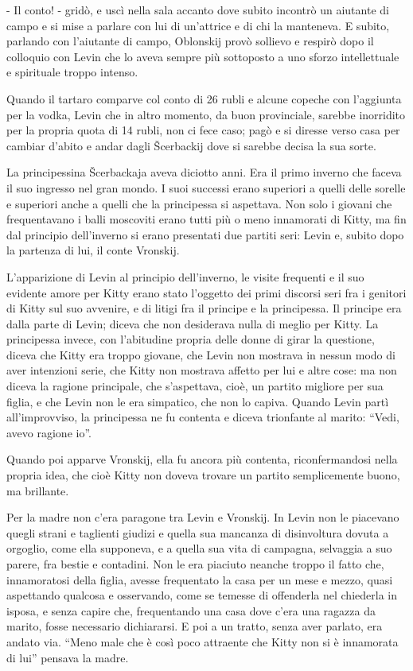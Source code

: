 - Il conto! - gridò, e uscì nella sala accanto dove subito incontrò un aiutante di campo e si mise a parlare con lui di un'attrice e di chi la manteneva. E subito, parlando con l'aiutante di campo, Oblonskij provò sollievo e respirò dopo il colloquio con Levin che lo aveva sempre più sottoposto a uno sforzo intellettuale e spirituale troppo intenso. 

Quando il tartaro comparve col conto di 26 rubli e alcune copeche con l'aggiunta per la vodka, Levin che in altro momento, da buon provinciale, sarebbe inorridito per la propria quota di 14 rubli, non ci fece caso; pagò e si diresse verso casa per cambiar d'abito e andar dagli Šcerbackij dove si sarebbe decisa la sua sorte. 

La principessina Šcerbackaja aveva diciotto anni. Era il primo inverno che faceva il suo ingresso nel gran mondo. I suoi successi erano superiori a quelli delle sorelle e superiori anche a quelli che la principessa si aspettava. Non solo i giovani che frequentavano i balli moscoviti erano tutti più o meno innamorati di Kitty, ma fin dal principio dell'inverno si erano presentati due partiti seri: Levin e, subito dopo la partenza di lui, il conte Vronskij. 

L'apparizione di Levin al principio dell'inverno, le visite frequenti e il suo evidente amore per Kitty erano stato l'oggetto dei primi discorsi seri fra i genitori di Kitty sul suo avvenire, e di litigi fra il principe e la principessa. Il principe era dalla parte di Levin; diceva che non desiderava nulla di meglio per Kitty. La principessa invece, con l'abitudine propria delle donne di girar la questione, diceva che Kitty era troppo giovane, che Levin non mostrava in nessun modo di aver intenzioni serie, che Kitty non mostrava affetto per lui e altre cose: ma non diceva la ragione principale, che s'aspettava, cioè, un partito migliore per sua figlia, e che Levin non le era simpatico, che non lo capiva. Quando Levin partì all'improvviso, la principessa ne fu contenta e diceva trionfante al marito: ``Vedi, avevo ragione io''. 

Quando poi apparve Vronskij, ella fu ancora più contenta, riconfermandosi nella propria idea, che cioè Kitty non doveva trovare un partito semplicemente buono, ma brillante. 

Per la madre non c'era paragone tra Levin e Vronskij. In Levin non le piacevano quegli strani e taglienti giudizi e quella sua mancanza di disinvoltura dovuta a orgoglio, come ella supponeva, e a quella sua vita di campagna, selvaggia a suo parere, fra bestie e contadini. Non le era piaciuto neanche troppo il fatto che, innamoratosi della figlia, avesse frequentato la casa per un mese e mezzo, quasi aspettando qualcosa e osservando, come se temesse di offenderla nel chiederla in isposa, e senza capire che, frequentando una casa dove c'era una ragazza da marito, fosse necessario dichiararsi. E poi a un tratto, senza aver parlato, era andato via. ``Meno male che è così poco attraente che Kitty non si è innamorata di lui'' pensava la madre. 


